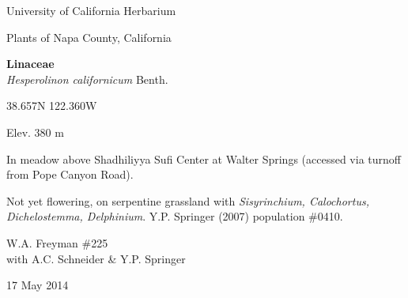 \documentclass[letterpaper,10pt]{article}
\begin{document}
\begin{minipage}[t]{0.40\textwidth}

\begin{center}
University of California Herbarium \\
\begin{large}
Plants of Napa County, California \\
\end{large}
\vspace{\baselineskip}
\textbf{Linaceae} \\
\textit{Hesperolinon californicum} Benth.\\
\end{center}

\begin{footnotesize}

\begin{multicols}{2}
38.657\textdegree N 122.360\textdegree W
\columnbreak
\begin{flushright}
Elev. 380 m
\end{flushright}
\end{multicols}

In meadow above Shadhiliyya Sufi Center at Walter Springs (accessed via turnoff from Pope Canyon Road).
\vspace{\baselineskip}

Not yet flowering, on serpentine grassland with \textit{Sisyrinchium, Calochortus, Dichelostemma, Delphinium}. Y.P. Springer (2007) population \#0410.

\begin{multicols}{2}
W.A. Freyman \#225 \\
with A.C. Schneider \& Y.P. Springer
\columnbreak
\begin{flushright}
17 May 2014
\end{flushright}
\end{multicols}

\end{footnotesize}

\end{minipage}
%
\hspace{2cm}
%
\end{document}

